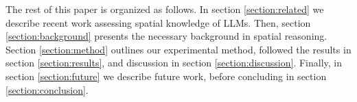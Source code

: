 

The rest of this paper is organized as follows.
In section \ref{section:related} we describe recent work assessing spatial knowledge of LLMs.
Then, section \ref{section:background} presents the necessary background in spatial reasoning.
Section \ref{section:method} outlines our experimental method, followed the results in section \ref{section:results}, and discussion in section \ref{section:discussion}.
Finally, in section \ref{section:future} we describe future work, before concluding in section \ref{section:conclusion}. 




%
%
%



